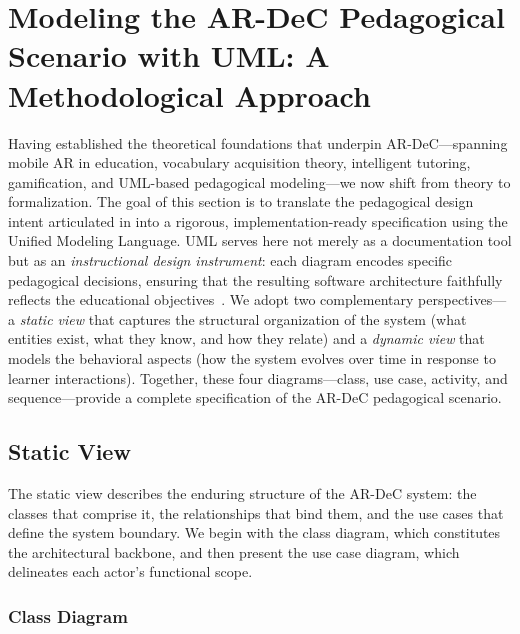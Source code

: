 \section{Modeling the AR-DeC Pedagogical Scenario with UML: A Methodological Approach}
\label{sec:modeling}

Having established the theoretical foundations that underpin AR-DeC---spanning mobile AR in education, vocabulary acquisition theory, intelligent tutoring, gamification, and UML-based pedagogical modeling---we now shift from theory to formalization. The goal of this section is to translate the pedagogical design intent articulated in  into a rigorous, implementation-ready specification using the Unified Modeling Language. UML serves here not merely as a documentation tool but as an \emph{instructional design instrument}: each diagram encodes specific pedagogical decisions, ensuring that the resulting software architecture faithfully reflects the educational objectives~\cite{Booch2005,Ouariach2026}. We adopt two complementary perspectives---a \emph{static view} that captures the structural organization of the system (what entities exist, what they know, and how they relate) and a \emph{dynamic view} that models the behavioral aspects (how the system evolves over time in response to learner interactions). Together, these four diagrams---class, use case, activity, and sequence---provide a complete specification of the AR-DeC pedagogical scenario.

\subsection{Static View}
\label{sec:static}

The static view describes the enduring structure of the AR-DeC system: the classes that comprise it, the relationships that bind them, and the use cases that define the system boundary. We begin with the class diagram, which constitutes the architectural backbone, and then present the use case diagram, which delineates each actor's functional scope.

\subsubsection{Class Diagram}
\label{sec:classdiagram}

